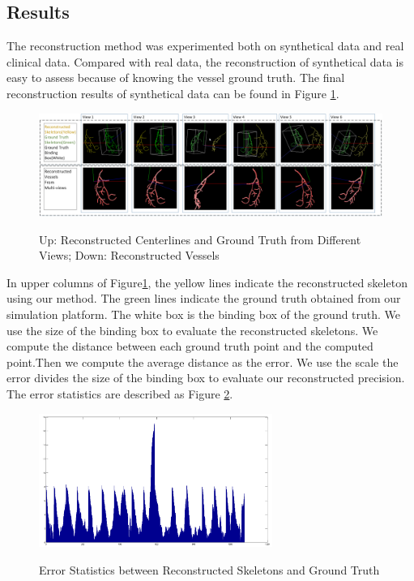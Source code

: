\subsection{Results}

The reconstruction method was experimented both on synthetical data and real
clinical data. Compared with real data, the reconstruction of synthetical
data is easy to assess because of knowing the vessel ground truth. The final
reconstruction results of synthetical data can be found in Figure
\ref{fig:experiments_full}.

\begin{figure}
  \centering
  \includegraphics[width=6.0in]{experiments_full.png}\\
  \caption{Up: Reconstructed Centerlines and Ground Truth from Different Views; Down: Reconstructed Vessels}\label{fig:experiments_full}
\end{figure}

In upper columns of Figure\ref{fig:experiments_full}, the yellow lines
indicate the reconstructed skeleton using our method. The green lines
indicate the ground truth obtained from our simulation platform. The white
box is the binding box of the ground truth. We use the size of the binding
box to evaluate the reconstructed skeletons. We compute the distance between
each ground truth point and the computed point.Then we compute the average
distance as the error. We use the scale the error divides the size of the
binding box to evaluate our reconstructed precision. The error statistics
are described as Figure \ref{fig:error_statistics}.

\begin{figure}
  \centering
  \includegraphics[width=3.0in]{error_statistics.png}\\
  \caption{Error Statistics between Reconstructed Skeletons and Ground Truth}\label{fig:error_statistics}
\end{figure}

